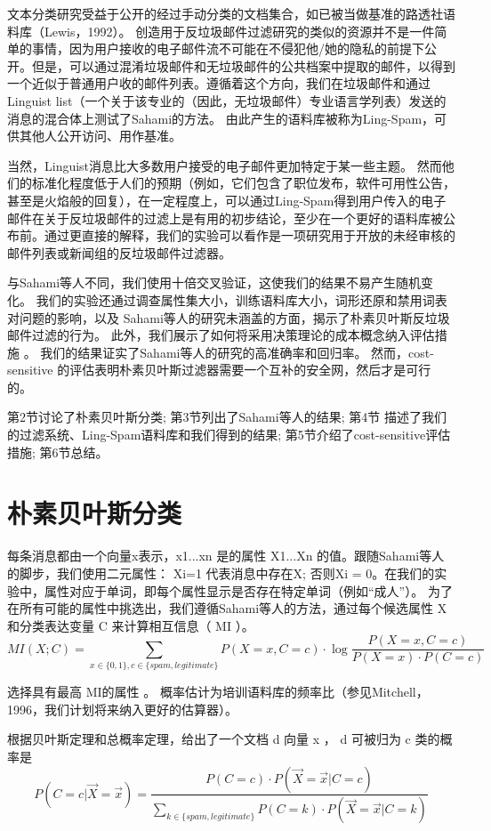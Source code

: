 \documentclass[UTF8]{ctexart}
\begin{document}
文本分类研究受益于公开的经过手动分类的文档集合，如已被当做基准的路透社语料库（Lewis，1992）。 创造用于反垃圾邮件过滤研究的类似的资源并不是一件简单的事情，因为用户接收的电子邮件流不可能在不侵犯他/她的隐私的前提下公开。但是，可以通过混淆垃圾邮件和无垃圾邮件的公共档案中提取的邮件，以得到一个近似于普通用户收的邮件列表。遵循着这个方向，我们在垃圾邮件和通过Linguist list（一个关于该专业的（因此，无垃圾邮件）专业语言学列表）发送的消息的混合体上测试了Sahami的方法。 由此产生的语料库被称为Ling-Spam，可供其他人公开访问、用作基准。 

当然，Linguist消息比大多数用户接受的电子邮件更加特定于某一些主题。 然而他们的标准化程度低于人们的预期（例如，它们包含了职位发布，软件可用性公告，甚至是火焰般的回复），在一定程度上，可以通过Ling-Spam得到用户传入的电子邮件在关于反垃圾邮件的过滤上是有用的初步结论，至少在一个更好的语料库被公布前。通过更直接的解释，我们的实验可以看作是一项研究用于开放的未经审核的邮件列表或新闻组的反垃圾邮件过滤器。 

与Sahami等人不同，我们使用十倍交叉验证，这使我们的结果不易产生随机变化。 我们的实验还通过调查属性集大小，训练语料库大小，词形还原和禁用词表对问题的影响，以及 Sahami等人的研究未涵盖的方面，揭示了朴素贝叶斯反垃圾邮件过滤的行为。 此外，我们展示了如何将采用决策理论的成本概念纳入评估措施 。 我们的结果证实了Sahami等人的研究的高准确率和回归率。 然而，cost-sensitive 的评估表明朴素贝叶斯过滤器需要一个互补的安全网，然后才是可行的。

第2节讨论了朴素贝叶斯分类; 第3节列出了Sahami等人的结果; 第4节 描述了我们的过滤系统、Ling-Spam语料库和我们得到的结果; 第5节介绍了cost-sensitive评估措施; 第6节总结。

\section{朴素贝叶斯分类}
每条消息都由一个向量x表示，x1...xn 是的属性 X1...Xn 的值。跟随Sahami等人的脚步，我们使用二元属性： Xi=1 代表消息中存在X; 否则Xi = 0。在我们的实验中，属性对应于单词，即每个属性显示是否存在特定单词（例如“成人”）。 为了在所有可能的属性中挑选出，我们遵循Sahami等人的方法，通过每个候选属性 X 和分类表达变量 C 来计算相互信息（ MI ）。
$$M I(X;C)=\sum_{x \in\{0,1\}, c \in\{spam, legitimate\}} P(X=x, C=c) \cdot \log \frac{P(X=x, C=c)}{P(X=x) \cdot P(C=c)}$$

选择具有最高 MI的属性 。 概率估计为培训语料库的频率比（参见Mitchell，1996，我们计划将来纳入更好的估算器）。

根据贝叶斯定理和总概率定理，给出了一个文档 d 向量 x ， d 可被归为 c 类的概率是
$$P(C=c | \vec{X}=\vec{x})=\frac{P(C=c) \cdot P(\vec{X}=\vec{x} | C=c)}{\sum_{k \in\{spam,legitimate\}} P(C=k) \cdot P(\vec{X}=\vec{x} | C=k)}$$
\end{document}
